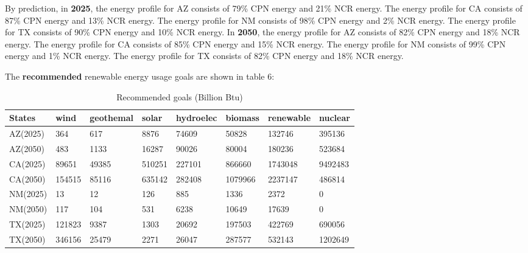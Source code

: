 \documentclass{mcmthesis}
\begin{document}
By prediction, in {\bf{2025}}, the energy profile for AZ consists of 79\% CPN energy and 21\% NCR energy. The energy profile for CA consists of 87\% CPN energy and 13\% NCR energy. The energy profile for NM consists of 98\% CPN energy and 2\% NCR energy. The energy profile for TX consists of 90\% CPN energy and 10\% NCR energy.  In {\bf{2050}}, the energy profile for AZ consists of 82\% CPN energy and 18\% NCR energy. The energy profile for CA consists of 85\% CPN energy and 15\% NCR energy. The energy profile for NM consists of 99\% CPN energy and 1\% NCR energy. The energy profile for TX consists of 82\% CPN energy and 18\% NCR energy.

The {\bf{recommended}} renewable energy usage goals are shown in table 6:

\begin{table}[H]
\caption{Recommended goals (Billion Btu)}
 \renewcommand\arraystretch{1.5}
 \setlength{\abovecaptionskip}{0pt}%
\setlength{\belowcaptionskip}{10pt}%
\begin{center}
\begin{tabular}{p{}<{\centering}p{}<{\centering}
p{}<{\centering}p{}<{\centering}
p{}<{\centering}p{}<{\centering}
p{}<{\centering}p{}<{\centering} }

\toprule[1.5pt]
States & wind & geothemal &	solar &	hydroelec &	biomass &	renewable & nuclear \\
 \midrule

AZ(2025) & 364 & 617 & 8876 & 74609 & 50828 & 132746 & 395136 \\
AZ(2050) & 483 &	1133 &	16287 &	90026 &	80004 &	180236 &	523684 \\

CA(2025) & 89651 &	49385 &	510251 & 227101 &	866660 & 1743048 &	9492483\\
CA(2050) & 154515 & 85116 & 635142 & 282408 & 1079966 & 2237147 & 486814 \\

NM(2025) & 13	& 12 & 126 & 885 & 1336 & 2372 & 0 \\
NM(2050) &117 & 104 & 531 & 6238 & 10649 & 17639 & 0 \\

TX(2025) & 121823 &	9387 &	1303 &	20692 &	197503 &	422769 &	690056 \\
TX(2050) & 346156 &	25479 &	2271 &	26047 &	287577 &	532143 &	1202649 \\

 \bottomrule[1.5pt]
 \end{tabular}
 \end{center} 
 \end{table}
 
\end{document}
